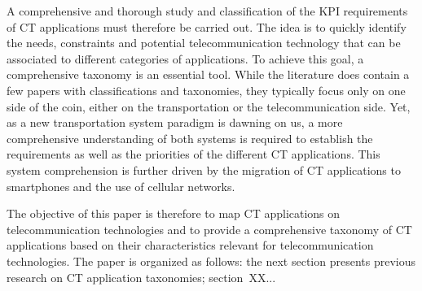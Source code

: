 A comprehensive and thorough study and classification of the \acrshort{KPI} requirements of \acrshort{CT} applications must therefore be carried out. The idea is to quickly identify the needs, constraints and potential telecommunication technology that can be associated to different categories of applications. To achieve this goal, a comprehensive taxonomy is an essential tool. While the literature does contain a few papers with classifications and taxonomies, they typically focus only on one side of the coin, either on the transportation or the telecommunication side. Yet, as a new transportation system paradigm is dawning on us, a more comprehensive understanding of both systems is required to establish the requirements as well as the priorities of the different \acrshort{CT} applications. This system comprehension is further driven by the migration of \acrshort{CT} applications to smartphones and the use of cellular networks.

The objective of this paper is therefore to map \acrshort{CT} applications on telecommunication technologies and to provide a comprehensive taxonomy of \acrshort{CT} applications based on their characteristics relevant for telecommunication technologies. The paper is organized as follows: the next section presents previous research on \acrshort{CT} application taxonomies; section~XX...
